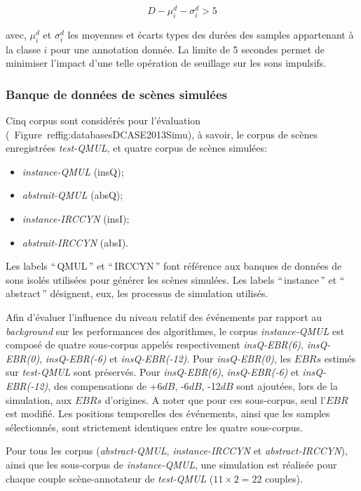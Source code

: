 \begin{equation}
D-\mu_i^d-\sigma_i^d>5
\end{equation}

avec, $\mu_i^d$ et $\sigma_i^d$ les moyennes et écarts types des durées des samples appartenant à la classe $i$ pour une annotation donnée. La limite de 5 secondes permet de minimiser l'impact d'une telle opération de seuillage sur les sons impulsifs.

\subsubsection{Banque de données de scènes simulées}
\label{sec:ch7_datasetEtEbr}

Cinq corpus sont considérés pour l'évaluation (\cf~Figure~ref{fig:databasesDCASE2013Simu}), à savoir, le corpus de scènes enregistrées \emph{test-QMUL}, et quatre corpus de scènes simulées:

\begin{itemize}
\item \emph{instance-QMUL} (insQ);
\item \emph{abstrait-QMUL} (absQ);
\item \emph{instance-IRCCYN} (insI);
\item \emph{abstrait-IRCCYN} (absI).
\end{itemize}

Les labels ``\,QMUL\,'' et ``\,IRCCYN\,'' font référence aux banques de données de sons isolés utilisées pour générer les scènes simulées. Les labels ``\,instance\,'' et ``\,abstract\,'' désignent, eux, les processus de simulation utilisés. 

Afin d'évaluer l'influence du niveau relatif des événements par rapport au \emph{background} sur les performances des algorithmes, le corpus \emph{instance-QMUL} est composé de quatre sous-corpus appelés respectivement \emph{insQ-EBR(6)}, \emph{insQ-EBR(0)}, \emph{insQ-EBR(-6)} et \emph{insQ-EBR(-12)}. Pour \emph{insQ-EBR(0)}, les $EBRs$ estimés sur \emph{test-QMUL} sont préservés.  Pour \emph{insQ-EBR(6)}, \emph{insQ-EBR(-6)} et \emph{insQ-EBR(-12)}, des compensations de +6$dB$, -6$dB$, -12$dB$ sont ajoutées, lors de la simulation, aux $EBRs$ d'origines. A noter que pour ces sous-corpus, seul l'$EBR$ est modifié. Les positions temporelles des événements, ainsi que les samples sélectionnés, sont strictement identiques entre les quatre sous-corpus.

Pour tous les corpus (\emph{abstract-QMUL}, \emph{instance-IRCCYN} et \emph{abstract-IRCCYN}), ainsi que les sous-corpus de \emph{instance-QMUL}, une simulation est réalisée pour chaque couple scène-annotateur de \emph{test-QMUL} ($11\times2=22$ couples). 

